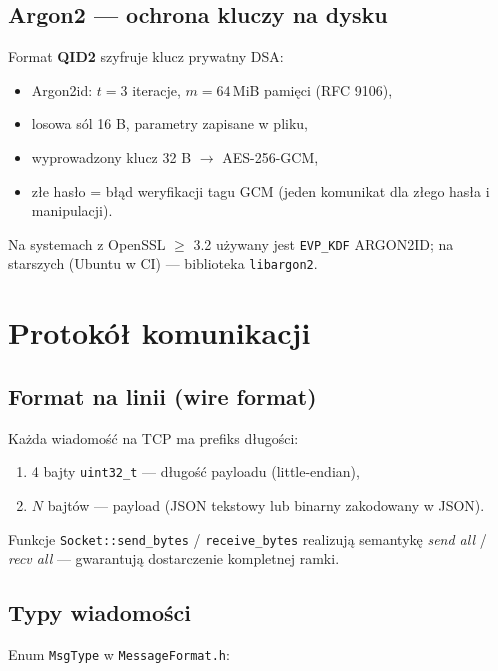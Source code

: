 \documentclass[12pt,a4paper]{article}
\begin{document}
\subsection{Argon2 --- ochrona kluczy na dysku}

Format \textbf{QID2} szyfruje klucz prywatny DSA:
\begin{itemize}
    \item Argon2id: $t=3$ iteracje, $m=64$\,MiB pamięci (RFC 9106),
    \item losowa sól 16 B, parametry zapisane w pliku,
    \item wyprowadzony klucz 32 B $\rightarrow$ AES-256-GCM,
    \item złe hasło = błąd weryfikacji tagu GCM (jeden komunikat dla złego hasła i manipulacji).
\end{itemize}

Na systemach z OpenSSL $\geq$ 3.2 używany jest \texttt{EVP\_KDF} ARGON2ID; na starszych (Ubuntu w CI) --- biblioteka \texttt{libargon2}.

\section{Protokół komunikacji}

\subsection{Format na linii (wire format)}

Każda wiadomość na TCP ma prefiks długości:
\begin{enumerate}
    \item 4 bajty \texttt{uint32\_t} --- długość payloadu (little-endian),
    \item $N$ bajtów --- payload (JSON tekstowy lub binarny zakodowany w JSON).
\end{enumerate}

Funkcje \texttt{Socket::send\_bytes} / \texttt{receive\_bytes} realizują semantykę \emph{send all} / \emph{recv all} --- gwarantują dostarczenie kompletnej ramki.

\subsection{Typy wiadomości}

Enum \texttt{MsgType} w \texttt{MessageFormat.h}:
\end{document}

